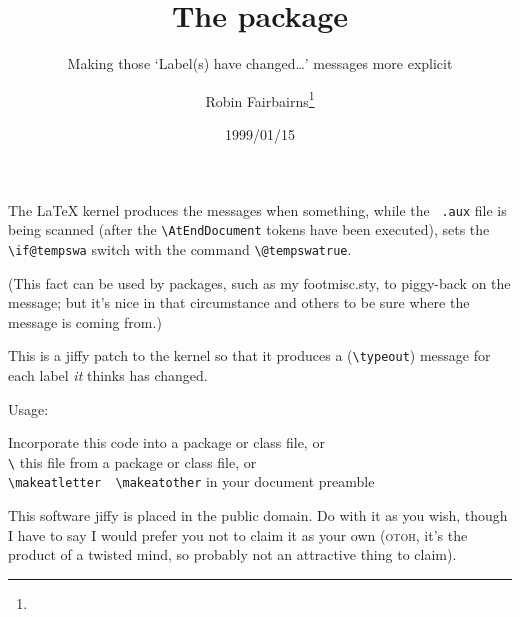 \documentclass[pagesize=auto, fontsize=12pt, DIV=9, parskip=half]{scrartcl}
\title{The \pkg{checklab} package}
\subtitle{Making those `Label(s) have changed\dots' messages more explicit}
\author{Robin Fairbairns\thanks{\mail{rf10@cl.cam.ac.uk}}}
\date{1999/01/15}
\makeatletter
\newcommand*{\pkg}[1]{\textsf{#1}}
\newcommand*{\cs}[1]{\texttt{\textbackslash#1}}
\newcommand*{\cmd}[1]{\cs{\expandafter\@gobble\string#1}}
\makeatother
\begin{document}
\maketitle

The \LaTeX{} kernel produces the messages when something, while the~%
\verb|.aux| file is being scanned (after the \cs{AtEndDocument} tokens
have been executed), sets the \cs{if@tempswa} switch with the
command \cs{@tempswatrue}.

(This fact can be used by packages, such as my \pkg{footmisc.sty}, to
piggy-back on the message; but it's nice in that circumstance and
others to be sure where the message is coming from.)

This is a jiffy patch to the kernel so that it produces a
(\cs{typeout}) message for each label \emph{it} thinks has changed.

\begin{labeling}{Usage:}
\item[Usage:]
  Incorporate this code into a package or class file, \hfill or \\
  \cmd{} this file from a package or class file, \hfill or \\
  \verb|\makeatletter  \makeatother| in your document preamble
\end{labeling}

This software jiffy is placed in the public domain.  Do with it as
you wish, though I have to say I would prefer you not to claim it
as your own (\textsc{otoh}, it's the product of a twisted mind, so probably
not an attractive thing to claim).
\end{document}
